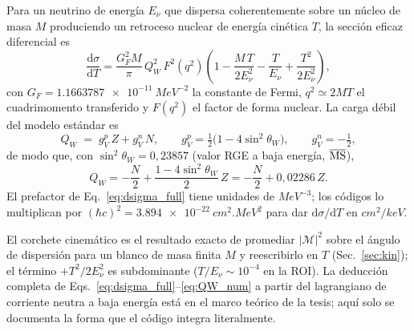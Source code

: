 \documentclass[11pt,a4paper]{article}
\newcommand{\QW}{Q_{W}}
\newcommand{\Enu}{E_{\nu}}
\newcommand{\Tnr}{T}
\newcommand{\dd}{\mathrm{d}}
\begin{document}
Para un neutrino de energ\'ia $\Enu$ que dispersa coherentemente sobre un
n\'ucleo de masa $M$ produciendo un retroceso nuclear de energ\'ia cin\'etica
$\Tnr$, la secci\'on eficaz diferencial es
\begin{equation}
  \label{eq:dsigma_full}
  \frac{\dd\sigma}{\dd \Tnr}
  = \frac{G_{F}^{2} M}{\pi}\,\QW^{2}\,F^{2}(q^{2})
    \left(
      1 - \frac{M\,\Tnr}{2\Enu^{2}} - \frac{\Tnr}{\Enu}
        + \frac{\Tnr^{2}}{2\Enu^{2}}
    \right),
\end{equation}
con $G_{F}=\SI{1.1663787e-11}{MeV^{-2}}$ la constante de Fermi,
$q^{2}\simeq 2M\Tnr$ el cuadrimomento transferido y $F(q^{2})$ el factor de forma
nuclear. La carga d\'ebil del modelo est\'andar es
\begin{equation}
  \label{eq:QW_SM}
  \QW \;=\; g_{V}^{p}\,Z + g_{V}^{n}\,N,
  \qquad
  g_{V}^{p} = \tfrac{1}{2}\bigl(1 - 4\sin^{2}\theta_{W}\bigr),
  \qquad
  g_{V}^{n} = -\tfrac{1}{2},
\end{equation}
de modo que, con $\sin^{2}\theta_{W}=0{,}23857$ (valor RGE a baja energ\'ia,
$\overline{\rm MS}$),
\begin{equation}
  \label{eq:QW_num}
  \QW = -\frac{N}{2} + \frac{1 - 4\sin^{2}\theta_{W}}{2}\,Z
      = -\frac{N}{2} + 0{,}02286\,Z .
\end{equation}
El prefactor de Eq.~\eqref{eq:dsigma_full} tiene unidades de
$\si{MeV^{-3}}$; los c\'odigos lo multiplican por
$(\hbar c)^{2}=\SI{3.894e-22}{cm^{2}.MeV^{2}}$ para dar
$\dd\sigma/\dd\Tnr$ en $\si{cm^{2}/keV}$.

El corchete cinem\'atico es el resultado exacto de promediar $|\mathcal{M}|^{2}$
sobre el \'angulo de dispersi\'on para un blanco de masa finita $M$ y reescribirlo
en $\Tnr$ (Sec.~\ref{sec:kin}); el t\'ermino $+\Tnr^{2}/2\Enu^{2}$ es
subdominante ($\Tnr/\Enu\sim10^{-4}$ en la ROI). La deducci\'on completa de
Eqs.~\eqref{eq:dsigma_full}--\eqref{eq:QW_num} a partir del lagrangiano de
corriente neutra a baja energ\'ia est\'a en el marco te\'orico de la tesis; aqu\'i
solo se documenta la forma que el c\'odigo integra literalmente.
\end{document}
